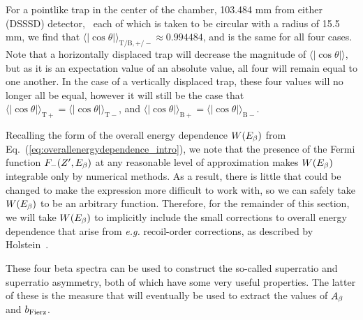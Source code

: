 For a pointlike trap in the center of the chamber, 103.484 mm from either (DSSSD) detector,~ each of which is taken to be circular with a radius of 15.5 mm, we find that $\langle | \cos\theta | \rangle_{\mathrm T/ \mathrm B, +/-} \approx 0.994484$, and is the same for all four cases.
 Note that a horizontally displaced trap will decrease the magnitude of $\langle | \cos\theta | \rangle $, but as it is an expectation value of an absolute value, all four will remain equal to one another.  In the case of a vertically displaced trap, these four values will no longer all be equal, however it will still be the case that $\langle | \cos\theta | \rangle_{\mathrm T +} = \langle | \cos\theta | \rangle_{\mathrm T -}$, and $\langle | \cos\theta | \rangle_{\mathrm B+} = \langle | \cos\theta | \rangle_{\mathrm B -}$.  


Recalling the form of the overall energy dependence $W(E_{\beta})$ from Eq.~(\ref{eq:overallenergydependence_intro}), we note that the presence of the Fermi function $F_{-}(Z^\prime, E_\beta)$ at any reasonable level of approximation makes $W(E_{\beta})$ integrable only by numerical methods.  As a result, there is little that could be changed to make the expression more difficult to work with, so we can safely take $W(E_{\beta})$ to be an arbitrary function.  Therefore, for the remainder of this section, we will take $W(E_{\beta})$ to implicitly include the small corrections to overall energy dependence that arise from \emph{e.g.}\! recoil-order corrections, as described by Holstein~\cite{holstein}.


These four beta spectra can be used to construct the so-called superratio and superratio asymmetry, both of which have some very useful properties.  The latter of these is the measure that will eventually be used to extract the values of $A_{\beta}$ and $b_{\mathrm{Fierz}}$.   

